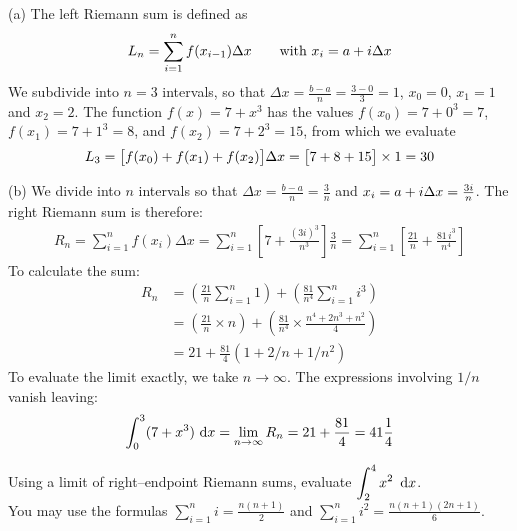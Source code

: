 \begin{solution} (a)
The left Riemann sum is defined as
\begin{align*}
  L_n = \sum_{i=1}^{n}  f(x_{i-1})\Delta x
    \qquad\text{with }x_i=a+i\Delta x
\end{align*}
We subdivide into $n=3$ intervals, so that $\Delta x = \frac{b-a}{n}
=\frac{3-0}{3}=1$, $x_0=0$, $x_1=1$ and $x_2=2$.
The function $f(x) = 7 + x^3$ has the values
$f(x_0) = 7+0^3=7$,
$f(x_1) = 7+1^3=8$, and
$f(x_2) = 7+2^3=15$, from which we evaluate
\begin{align*}
L_3 = \big[f(x_0)+f(x_1)+f(x_2)\big]\Delta x = \big[7+8+15\big]\times 1= 30
\end{align*}

\noindent (b)
We divide into $n$ intervals so that
$\Delta x = \frac{b-a}{n}=\frac{3}{n}$ and  $x_i = a+i\Delta x= \frac{3i}{n}$.
The right Riemann sum is therefore:
\begin{align*}
R_n = \sum_{i=1}^{n}  f(x_i)\Delta x
    =  \sum_{i=1}^{n} \left[ 7 + \frac{(3i)^3}{n^3} \right] \frac{3}{n}
    =  \sum_{i=1}^{n} \left[ \frac{21}{n} + \frac{81\,i^3}{n^4} \right]
\end{align*}
To calculate the sum:
\begin{align*}
  R_n &= \left( \frac{21}{n} \sum_{i=1}^{n} 1 \right)
        +  \left( \frac{81}{n^4} \sum_{i=1}^{n} i^3 \right)\\
   &=\left( \frac{21}{n}\times n \right)+\left(  \frac{81}{n^4} \times \frac{n^4 +2n^3 + n^2}{4} \right)\\
                 &= 21 + \frac{81}{4}(1 +2/n + 1/n^2)
\end{align*}
To evaluate the limit exactly, we take $n \to \infty$. The expressions involving $1/n$ vanish leaving:
\begin{align*}
\int_0^3 (7 + x^3) \,\,\mathrm{d}x = \lim_{n \to \infty} R_n = 21 + \frac{81}{4} = 41 \frac{1}{4}
\end{align*}

\end{solution}



\begin{question}[2013A]
Using a limit of right--endpoint Riemann
sums, evaluate $\displaystyle\int_2^4 x^2\ \,\mathrm{d}x$. \\[5pt]
You may use the formulas
$\sum\limits_{i=1}^n i = \frac{n(n + 1)}{2}$ and
$\sum\limits_{i=1}^n i^2 = \frac{n(n + 1)(2n + 1)}{6}$.
\end{question}

